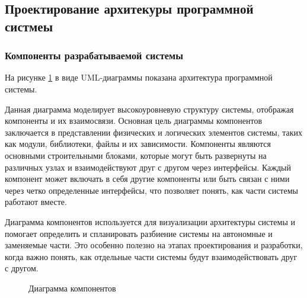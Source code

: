 \subsection{Проектирование архитекуры программной систмеы}

\subsubsection{Компоненты разрабатываемой системы}

На рисунке \ref{components:image} в виде UML-диаграммы показана архитектура программной системы.

Данная диаграмма моделирует высокоуровневую структуру системы, отображая компоненты и их взаимосвязи. Основная цель диаграммы компонентов заключается в представлении физических и логических элементов системы, таких как модули, библиотеки, файлы и их зависимости. Компоненты являются основными строительными блоками, которые могут быть развернуты на различных узлах и взаимодействуют друг с другом через интерфейсы. Каждый компонент может включать в себя другие компоненты или быть связан с ними через четко определенные интерфейсы, что позволяет понять, как части системы работают вместе\cite{uml}.

Диаграмма компонентов используется для визуализации архитектуры системы и помогает определить и спланировать разбиение системы на автономные и заменяемые части. Это особенно полезно на этапах проектирования и разработки, когда важно понять, как отдельные части системы будут взаимодействовать друг с другом.

\begin{figure}[H]
\caption{Диаграмма компонентов}
\label{components:image}
\end{figure}

